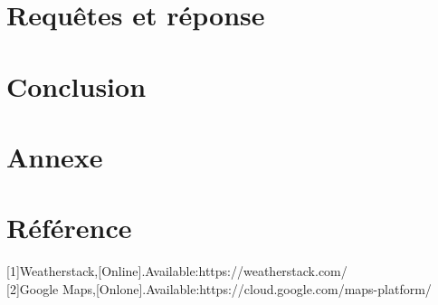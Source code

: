 \documentclass[14px]{article}
\begin{document}
\section{Requêtes et réponse}

\section{Conclusion}


\section{Annexe}
\begin{figure}
\end{figure}

\section{Référence}
[1]Weatherstack,[Online].Available:https://weatherstack.com/\\

[2]Google Maps,[Onlone].Available:https://cloud.google.com/maps-platform/\\
\end{document}
